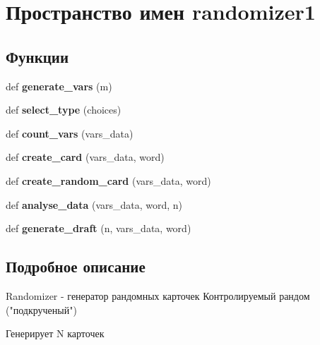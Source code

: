 \hypertarget{namespacerandomizer1}{}\section{Пространство имен randomizer1}
\label{namespacerandomizer1}
\subsection*{Функции}
\begin{DoxyCompactItemize}
\item 
\mbox{\label{namespacerandomizer1_a40bbd2b372ab50db7c35b965d9076355}} 
def {\bfseries generate\+\_\+vars} (m)
\item 
\mbox{\label{namespacerandomizer1_a82d6d6bde9c9bf9b4624bda3d736dc5a}} 
def {\bfseries select\+\_\+type} (choices)
\item 
\mbox{\label{namespacerandomizer1_a0d8fc6dae2c29e91762a929a62b58715}} 
def {\bfseries count\+\_\+vars} (vars\+\_\+data)
\item 
\mbox{\label{namespacerandomizer1_a3983afcdf70cda27af08b896fe7988cb}} 
def {\bfseries create\+\_\+card} (vars\+\_\+data, word)
\item 
\mbox{\label{namespacerandomizer1_a8acf66d6e60bed96fe8be151fd02fd57}} 
def {\bfseries create\+\_\+random\+\_\+card} (vars\+\_\+data, word)
\item 
\mbox{\label{namespacerandomizer1_a31473a95049c7598346cea38e5570082}} 
def {\bfseries analyse\+\_\+data} (vars\+\_\+data, word, n)
\item 
\mbox{\label{namespacerandomizer1_a587668ab51bf0a60bb1df68b2688d780}} 
def {\bfseries generate\+\_\+draft} (n, vars\+\_\+data, word)
\end{DoxyCompactItemize}


\subsection{Подробное описание}
\begin{DoxyVerb}Randomizer - генератор рандомных карточек
Контролируемый рандом ("подкрученый")

Генерирует N карточек
\end{DoxyVerb}
 